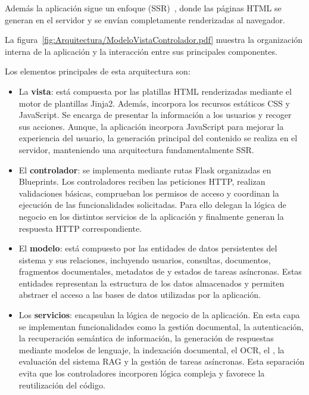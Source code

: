 Además la aplicación sigue un enfoque  (SSR)~\cite{diseño:SSR}, donde las páginas HTML se generan en el servidor y se envían completamente renderizadas al navegador.

La figura~\ref{fig:Arquitectura/ModeloVistaControlador.pdf} muestra la organización interna de la aplicación y la interacción entre sus principales componentes.


Los elementos principales de esta arquitectura son:

\begin{itemize}
	\item La \textbf{vista}: está compuesta por las platillas HTML renderizadas mediante el motor de plantillas Jinja2. Además, incorpora los recursos estáticos CSS y JavaScript. Se encarga de presentar la información a los usuarios y recoger sus acciones. Aunque, la aplicación incorpora JavaScript para mejorar la experiencia del usuario, la generación principal del contenido se realiza en el servidor, manteniendo una arquitectura fundamentalmente SSR.
	\item El \textbf{controlador}: se implementa mediante rutas Flask organizadas en Blueprints.	Los controladores reciben las peticiones HTTP, realizan validaciones básicas, comprueban los permisos de acceso y coordinan la ejecución de las funcionalidades solicitadas. Para ello delegan la lógica de negocio en los distintos servicios de la aplicación y finalmente generan la respuesta HTTP correspondiente. 
	\item El \textbf{modelo}: está compuesto por las entidades de datos persistentes del sistema y sus relaciones, incluyendo usuarios, consultas, documentos, fragmentos documentales, metadatos de  y estados de tareas asíncronas. Estas entidades representan la estructura de los datos almacenados y permiten abstraer el acceso a las bases de datos utilizadas por la aplicación.
	\item Los \textbf{servicios}: encapsulan la lógica de negocio de la aplicación. En esta capa se implementan funcionalidades como la gestión documental, la autenticación, la recuperación semántica de información, la generación de respuestas mediante modelos de lenguaje, la indexación documental, el OCR, el , la evaluación del sistema RAG y la gestión de tareas asíncronas. Esta separación evita que los controladores incorporen lógica compleja y favorece la reutilización del código.
	\end{itemize} 

